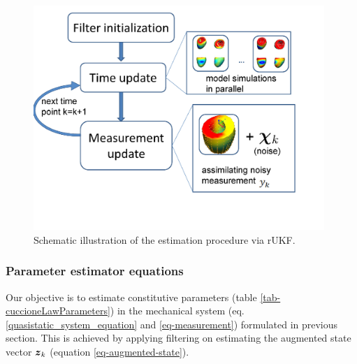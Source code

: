 \begin{figure}[h!]
\centering
\includegraphics[width=110mm]{ParameterEstimation/2010-08-09-rUKF-estimation-workflow.pdf} %
\caption{Schematic illustration of the estimation procedure via rUKF.}
\label{fig:schmeatic-rUKF}
\end{figure}


\subsubsection{Parameter estimator equations}
\label{sec-parameter-estimation-eq}
Our objective is to estimate constitutive parameters (table \ref{tab-cuccioneLawParameters}) in the mechanical system (eq. \ref{quasistatic_system_equation} and \ref{eq-measurement}) formulated in previous section. This is achieved by applying filtering on estimating the augmented state vector $\vect{z}_k$ (equation \ref{eq-augmented-state}).


